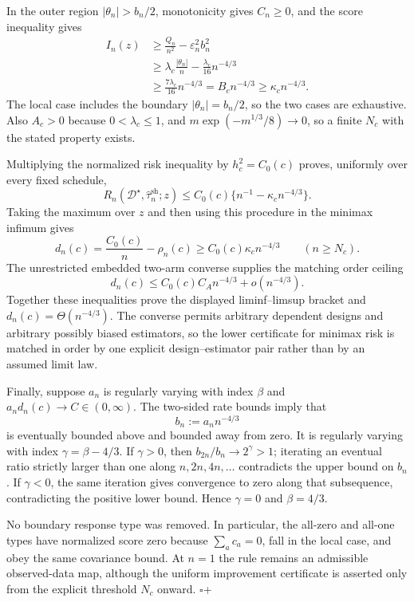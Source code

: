 In the outer region \(|\theta_n|>b_n/2\), monotonicity gives \(C_n\geq0\), and the score inequality gives
\[
 \begin{aligned}
 I_n(z)
 &\geq\frac{Q_n}{n^2}-\varepsilon_n^2b_n^2\\
 &\geq\lambda_c\frac{|\theta_n|}{n}-\frac{\lambda_c}{16}n^{-4/3}\\
 &\geq\frac{7\lambda_c}{16}n^{-4/3}
 =B_cn^{-4/3}
 \geq\kappa_cn^{-4/3}.
 \end{aligned}
\]
The local case includes the boundary \(|\theta_n|=b_n/2\), so the two cases are exhaustive. Also \(A_c>0\) because \(0<\lambda_c\leq1\), and \(m\exp(-m^{1/3}/8)\to0\), so a finite \(N_c\) with the stated property exists.

Multiplying the normalized risk inequality by \(h_c^2=C_0(c)\) proves, uniformly over every fixed schedule,
\[
 R_n(\mathcal D^\star,\widehat\tau_n^{\mathrm{sh}};z)
 \leq C_0(c)\{n^{-1}-\kappa_cn^{-4/3}\}.
\]
Taking the maximum over \(z\) and then using this procedure in the minimax infimum gives
\[
 d_n(c)=\frac{C_0(c)}n-\rho_n(c)
 \geq C_0(c)\kappa_cn^{-4/3}
 \qquad(n\geq N_c).
\]
The unrestricted embedded two-arm converse supplies the matching order ceiling
\[
 d_n(c)\leq C_0(c)C_A n^{-4/3}+o(n^{-4/3}).
\]
Together these inequalities prove the displayed liminf--limsup bracket and \(d_n(c)=\Theta(n^{-4/3})\). The converse permits arbitrary dependent designs and arbitrary possibly biased estimators, so the lower certificate for minimax risk is matched in order by one explicit design--estimator pair rather than by an assumed limit law.

Finally, suppose \(a_n\) is regularly varying with index \(\beta\) and \(a_nd_n(c)\to C\in(0,\infty)\). The two-sided rate bounds imply that
\[
 b_n:=a_nn^{-4/3}
\]
is eventually bounded above and bounded away from zero. It is regularly varying with index \(\gamma=\beta-4/3\). If \(\gamma>0\), then \(b_{2n}/b_n\to2^\gamma>1\); iterating an eventual ratio strictly larger than one along \(n,2n,4n,\ldots\) contradicts the upper bound on \(b_n\). If \(\gamma<0\), the same iteration gives convergence to zero along that subsequence, contradicting the positive lower bound. Hence \(\gamma=0\) and \(\beta=4/3\).

No boundary response type was removed. In particular, the all-zero and all-one types have normalized score zero because \(\sum_ac_a=0\), fall in the local case, and obey the same covariance bound. At \(n=1\) the rule remains an admissible observed-data map, although the uniform improvement certificate is asserted only from the explicit threshold \(N_c\) onward. \(\square\)+